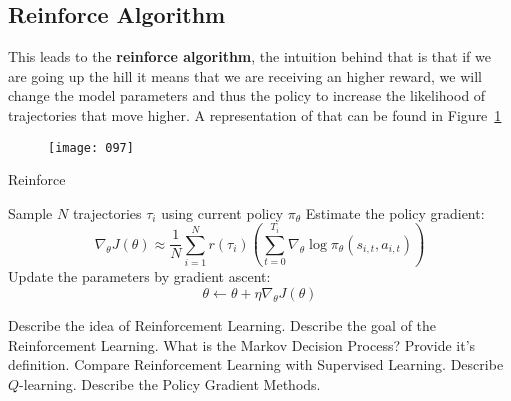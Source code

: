 \subsection{Reinforce Algorithm}
This leads to the \textbf{reinforce algorithm}, the intuition behind that is that if we are going up the hill it means that we are receiving an higher reward, we will change the model parameters and thus the policy to increase the likelihood of trajectories that move higher. A representation of that can be found in Figure~\ref{fig:097}
\begin{figure}[t!]
    \centering
    \texttt{[image: 097]}
    \caption{}
    \label{fig:097}
\end{figure}

\begin{algorithm}
    \caption{Reinforce}
    \label{alg:reinforce}
    
    Sample \(N\) trajectories \(\tau_i\) using current policy \(\pi_\theta\)\;
    Estimate the policy gradient:
    \begin{equation}
        \nabla_\theta J (\theta) \approx \frac 1 N \sum_{i=1}^N r (\tau_i) \left(
            \sum_{t=0}^{T_i} \nabla_\theta \log \pi_\theta (s_{i,t}, a_{i,t})
        \right)
    \end{equation}
    Update the parameters by gradient ascent:
    \begin{equation}
        \theta \gets \theta + \eta \nabla_\theta J(\theta)
    \end{equation}

\end{algorithm}

\newpage
\begin{exercise}
    \ex Describe the idea of Reinforcement Learning.
    \ex Describe the goal of the Reinforcement Learning.
    \ex What is the Markov Decision Process? Provide it's definition.
    \ex Compare Reinforcement Learning with Supervised Learning.
    \ex Describe \(Q\)-learning.
    \ex Describe the Policy Gradient Methods.
\end{exercise}